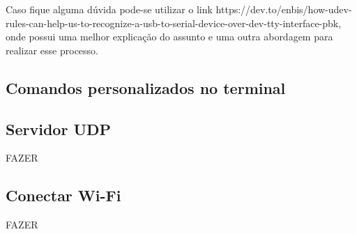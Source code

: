 		Caso fique alguma dúvida pode-se utilizar o link https://dev.to/enbis/how-udev-rules-can-help-us-to-recognize-a-usb-to-serial-device-over-dev-tty-interface-pbk, onde possui uma melhor explicação do assunto e uma outra abordagem para realizar esse processo.		

\subsection{Comandos personalizados no terminal}		

\subsection{Servidor UDP}
FAZER

\subsection{Conectar Wi-Fi}
FAZER
